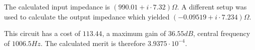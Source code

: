 \par

The calculated input impedance is $(990.01+i\cdot 7.32) \Omega$.
A different setup was used to calculate the output impedance which yielded $(-0.09519+i\cdot 7.234) \Omega$.

This circuit has a cost of $113.44$, a maximum gain of $36.55 dB$, central frequency of $1006.5 Hz$.
The calculated merit is therefore $3.9375\cdot 10^{-4}$.
